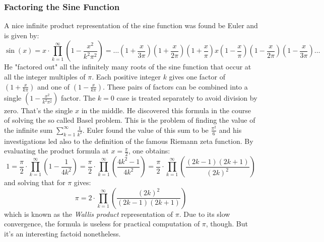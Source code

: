 \subsubsection{Factoring the Sine Function}
A nice infinite product representation of the sine function was found be Euler and is given by:
\begin{equation}
\sin(x) = x \cdot \prod_{k=1}^{\infty} \left( 1 - \frac{x^2}{k^2 \pi^2}  \right)
        = \ldots \left(1 + \frac{x}{3 \pi}  \right)
                 \left(1 + \frac{x}{2 \pi}  \right) 
                 \left(1 + \frac{x}{  \pi}  \right)
                 x 
                 \left(1 - \frac{x}{  \pi}  \right)
                 \left(1 - \frac{x}{2 \pi}  \right) 
                 \left(1 - \frac{x}{3 \pi}  \right)
          \ldots
\end{equation}
He "factored out" all the infinitely many roots of the sine function that occur at all the integer multiples of $\pi$. Each positive integer $k$ gives one factor of $(1 + \frac{x}{k \pi})$ and one of $(1 - \frac{x}{k \pi})$. These pairs of factors can be combined into a single $(1 - \frac{x^2}{k^2 \pi^2})$ factor. The $k=0$ case is treated separately to avoid division by zero. That's the single $x$ in the middle. He discovered this formula in the course of solving the so called Basel problem. This is the problem of finding the value of the infinite sum $\sum_{k=1}^{\infty} \frac{1}{k^2}$. Euler found the value of this sum to be $\frac{\pi^2}{6}$ and his investigations led also to the definition of the famous Riemann zeta function. By evaluating the product formula at $x = \frac{\pi}{2}$, one obtains:
\begin{equation}
 1 = \frac{\pi}{2} \cdot \prod_{k=1}^{\infty} \left( 1 - \frac{1}{4 k^2}  \right)
   = \frac{\pi}{2} \cdot \prod_{k=1}^{\infty} \left( \frac{4 k^2 - 1}{4 k^2}  \right)
   = \frac{\pi}{2} \cdot \prod_{k=1}^{\infty} \left( \frac{(2k-1)(2k+1)}{(2k)^2}  \right)   
\end{equation}
and solving that for $\pi$ gives:
\begin{equation}
\pi = 2 \cdot \prod_{k=1}^{\infty} \left( \frac{(2k)^2 }{(2k-1)(2k+1)} \right)   
\end{equation}
which is known as the \emph{Wallis product} representation of $\pi$. Due to its slow convergence, the formula is useless for practical computation of $\pi$, though. But it's an interesting factoid nonetheless. 


